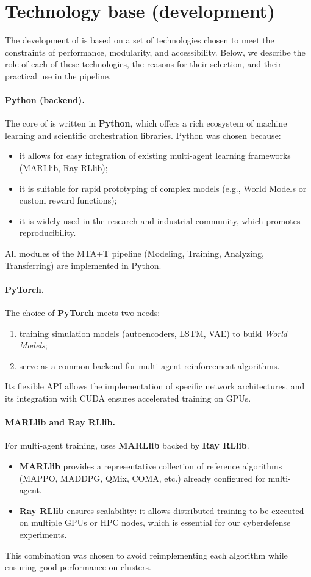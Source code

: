 \section{Technology base (development)}\label {sec:cybmasde_tech_stack}

The development of  is based on a set of technologies chosen to meet the constraints of performance, modularity, and accessibility.
Below, we describe the role of each of these technologies, the reasons for their selection, and their practical use in the pipeline.

\paragraph{Python (backend).}
The core of  is written in \textbf{Python}, which offers a rich ecosystem of machine learning and scientific orchestration libraries. Python was chosen because:
\begin{itemize}
  \item it allows for easy integration of existing multi-agent learning frameworks (MARLlib, Ray RLlib);
  \item it is suitable for rapid prototyping of complex models (e.g., World Models or custom reward functions);
  \item it is widely used in the research and industrial community, which promotes reproducibility.
\end{itemize}
All modules of the MTA+T pipeline (Modeling, Training, Analyzing, Transferring) are implemented in Python.

\paragraph{PyTorch.}
The choice of \textbf{PyTorch} meets two needs:
\begin{enumerate}
  \item training simulation models (autoencoders, LSTM, VAE) to build \textit{World Models};
  \item serve as a common backend for multi-agent reinforcement algorithms.
\end{enumerate}
Its flexible API allows the implementation of specific network architectures, and its integration with CUDA ensures accelerated training on GPUs.

\paragraph{MARLlib and Ray RLlib.}
For multi-agent training,  uses \textbf{MARLlib} backed by \textbf{Ray RLlib}.
\begin{itemize}
  \item \textbf{MARLlib} provides a representative collection of reference algorithms (MAPPO, MADDPG, QMix, COMA, etc.) already configured for multi-agent.
  \item \textbf{Ray RLlib} ensures scalability: it allows distributed training to be executed on multiple GPUs or HPC nodes, which is essential for our cyberdefense experiments.
\end{itemize}
This combination was chosen to avoid reimplementing each algorithm while ensuring good performance on clusters.

